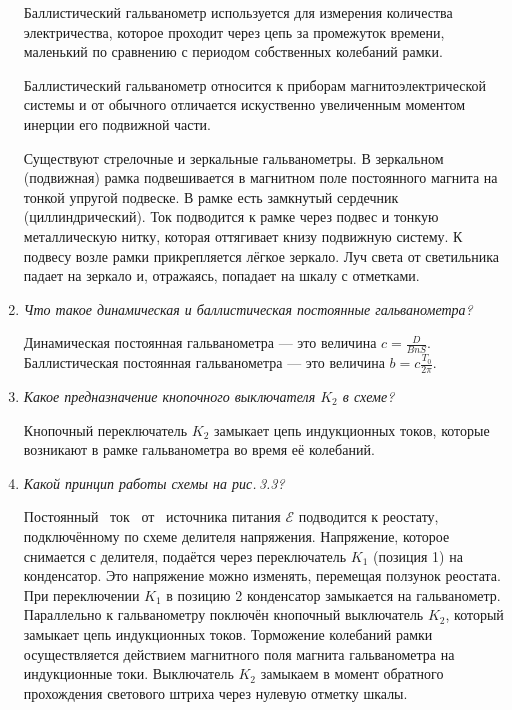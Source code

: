 \documentclass[a4paper,10pt]{article}
\begin{document}
\begin{enumerate}
Баллистический гальванометр используется для измерения количества электричества, которое проходит через цепь за промежуток времени,
маленький по сравнению с периодом собственных колебаний рамки.

Баллистический гальванометр относится к приборам магнитоэлектрической системы и от обычного отличается искуственно увеличенным моментом
инерции его подвижной части.

Существуют стрелочные и зеркальные гальванометры.
В зеркальном (подвижная) рамка подвешивается в магнитном поле постоянного магнита на тонкой упругой подвеске.
В рамке есть замкнутый сердечник (циллиндрический).
Ток подводится к рамке через подвес и тонкую металлическую нитку, которая оттягивает книзу подвижную систему.
К подвесу возле рамки прикрепляется лёгкое зеркало.
Луч света от светильника падает на зеркало и, отражаясь, попадает на шкалу с отметками.

\item \textit{Что такое динамическая и баллистическая постоянные гальванометра?}

Динамическая постоянная гальванометра --- это величина $c = \frac{D}{B n S}$.
Баллистическая постоянная гальванометра --- это величина $b = c\frac{T_0}{2\pi}$.

\item \textit{Какое предназначение кнопочного выключателя $K_2$ в схеме?}

Кнопочный переключатель $K_2$ замыкает цепь индукционных токов, которые возникают в рамке гальванометра во время её колебаний.

\item \textit{Какой принцип работы схемы на рис.\,3.3?}

Постоянный ~ток ~от ~источника питания $\mathcal{E}$ подводится к реостату, подключённому по схеме делителя напряжения.
Напряжение, которое снимается с делителя, подаётся через переключатель $K_1$ (позиция 1) на конденсатор.
Это напряжение можно изменять, перемещая ползунок реостата.
При переключении $K_1$ в позицию 2 конденсатор замыкается на гальванометр.
Параллельно к гальванометру поключён кнопочный выключатель $K_2$, который замыкает цепь индукционных токов.
Торможение колебаний рамки осуществляется действием магнитного поля магнита гальванометра на индукционные токи.
Выключатель $K_2$ замыкаем в момент обратного прохождения светового штриха через нулевую отметку шкалы.

\end{enumerate}
\end{document}
